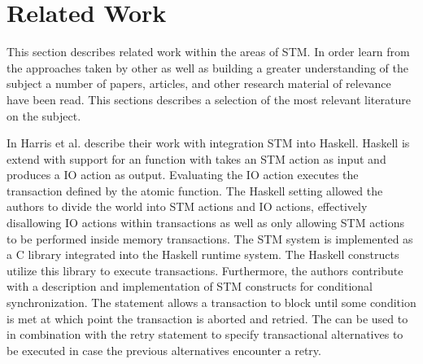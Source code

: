 \section{Related Work}
This section describes related work within the areas of \ac{STM}. In order learn from the approaches taken by other as well as building a greater understanding of the subject a number of papers, articles, and other research material of relevance have been read. This sections describes a selection of the most relevant literature on the subject.

In \cite{harris2005composable} Harris et al. describe their work with integration \ac{STM} into Haskell. Haskell is extend with support for an  function with takes an \ac{STM} action as input and produces a \ac{IO} action as output\cite[p. 51]{harris2005composable}. Evaluating the IO action executes the transaction defined by the atomic function. The Haskell setting allowed the authors to divide the world into \ac{STM} actions and \ac{IO} actions\cite[p. 51]{harris2005composable}, effectively disallowing \ac{IO} actions within transactions as well as only allowing \ac{STM} actions to be performed inside memory transactions. The \ac{STM} system is implemented as a C library integrated into the Haskell runtime system. The Haskell constructs utilize this library to execute transactions\cite[p. 56]{harris2005composable}. Furthermore, the authors contribute with a description and implementation of \ac{STM} constructs for conditional synchronization. The  statement allows a transaction to block until some condition is met at which point the transaction is aborted and retried\cite[p. 52]{harris2005composable}. The  can be used to in combination with the retry statement to specify transactional alternatives to be executed in case the previous alternatives encounter a retry\cite[p. 52]{harris2005composable}.


